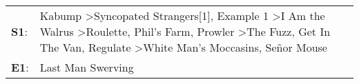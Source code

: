\begin{supertabular}{p{0.03\textwidth}p{0.92\textwidth}}
 \textbf{S1}:  &  Kabump\textsuperscript{} \textgreater \enspace Syncopated Strangers[1]\textsuperscript{}, \enspace Example 1\textsuperscript{} \textgreater \enspace I Am the Walrus\textsuperscript{} \textgreater \enspace Roulette\textsuperscript{}, \enspace Phil's Farm\textsuperscript{}, \enspace Prowler\textsuperscript{} \textgreater \enspace The Fuzz\textsuperscript{}, \enspace Get In The Van\textsuperscript{}, \enspace Regulate\textsuperscript{} \textgreater \enspace White Man's Moccasins\textsuperscript{}, \enspace Señor Mouse\textsuperscript{}  \enspace  \\
 \textbf{E1}:  &                                                                                                                                                                                                                                                                                                                                                                                                                                                                                                                         Last Man Swerving\textsuperscript{}  \enspace  \\
\end{supertabular}
